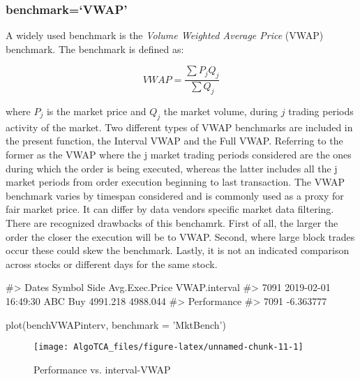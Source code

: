 \hypertarget{benchmarkvwap}{%
\subsubsection{benchmark=`VWAP'}\label{benchmarkvwap}}

A widely used benchmark is the \emph{Volume Weighted Average Price}
(VWAP) benchmark. The benchmark is defined as:

\[ VWAP = \frac{\sum {P_{j}Q_{j}}}{\sum {Q_{j}}} \]

where \(P_{j}\) is the market price and \(Q_{j}\) the market volume,
during \(j\) trading periods activity of the market. Two different types
of VWAP benchmarks are included in the present function, the Interval
VWAP and the Full VWAP. Referring to the former as the VWAP where the j
market trading periods considered are the ones during which the order is
being executed, whereas the latter includes all the j market periods
from order execution beginning to last transaction. The VWAP benchmark
varies by timespan considered and is commonly used as a proxy for fair
market price. It can differ by data vendors specific market data
filtering. There are recognized drawbacks of this benchamrk. First of
all, the larger the order the closer the execution will be to VWAP.
Second, where large block trades occur these could skew the benchmark.
Lastly, it is not an indicated comparison across stocks or different
days for the same stock.

\begin{Schunk}
\begin{Soutput}
#>                    Dates Symbol Side Avg.Exec.Price VWAP.interval
#> 7091 2019-02-01 16:49:30    ABC  Buy       4991.218      4988.044
#>      Performance
#> 7091   -6.363777
\end{Soutput}
\begin{Sinput}
plot(benchVWAPinterv, benchmark = 'MktBench')
\end{Sinput}
\begin{figure}

{\centering \texttt{[image: AlgoTCA\_files/figure-latex/unnamed-chunk-11-1]} 

}

\caption[Performance vs]{Performance vs. interval-VWAP}\label{fig:unnamed-chunk-11}
\end{figure}
\end{Schunk}

